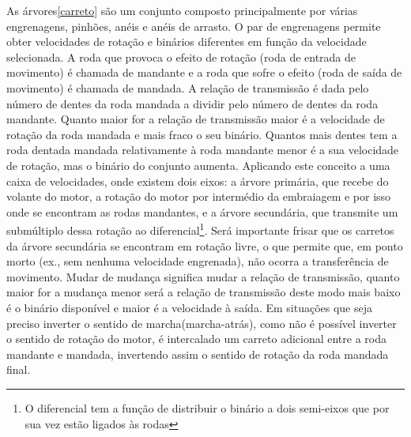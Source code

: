 As árvores\ref{carreto} são um conjunto composto principalmente por várias engrenagens, pinhões, anéis e anéis de arrasto. O par de engrenagens permite obter velocidades de rotação e binários diferentes em função da velocidade selecionada. A roda que provoca o efeito de rotação (roda de entrada de movimento) é chamada de mandante e a roda que sofre o efeito (roda de saída de movimento) é chamada de mandada. A relação de transmissão é dada pelo número de dentes da roda mandada a dividir pelo número de dentes da roda mandante. Quanto maior for a relação de transmissão maior é a velocidade de rotação da roda mandada e mais fraco o seu binário. Quantos mais dentes tem a roda dentada mandada relativamente à roda mandante menor é a sua velocidade de rotação, mas o binário do conjunto aumenta. Aplicando este conceito a uma caixa de velocidades, onde existem dois eixos: a árvore primária, que recebe do volante do motor, a rotação do motor por intermédio da embraiagem e por isso onde se encontram as rodas mandantes, e a árvore secundária, que transmite um submúltiplo dessa rotação ao diferencial\footnote{O diferencial tem a função de distribuir o binário a dois semi-eixos que por sua vez estão ligados às rodas}. Será importante frisar que os carretos da árvore secundária se encontram em rotação livre, o que permite que, em ponto morto (ex., sem nenhuma velocidade engrenada), não ocorra a transferência de movimento.
Mudar de mudança significa mudar a relação de transmissão, quanto maior for a mudança menor será a relação de transmissão deste modo mais baixo é o binário disponível e maior é a velocidade à saída. Em situações que seja preciso inverter o sentido de marcha(marcha-atrás), como não é possível inverter o sentido de rotação do motor, é intercalado um carreto adicional entre a roda mandante e mandada, invertendo assim o sentido de rotação da roda mandada final.

